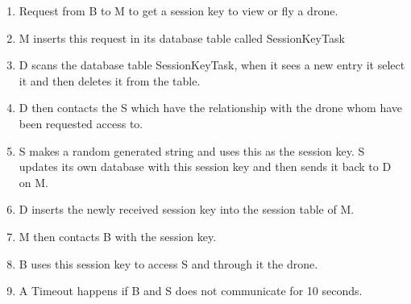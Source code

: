 \begin{enumerate}
	\item Request from B to M to get a session key to view or fly a drone.
	\item M inserts this request in its database table called SessionKeyTask
	\item D scans the database table SessionKeyTask, when it sees a new entry it select it and then deletes it from the table.
	\item D then contacts the S which have the relationship with the drone whom have been requested access to.
	\item S makes a random generated string and uses this as the session key. S updates its own database with this session key and then sends it back to D on M.
	\item D inserts the newly received session key into the session table of M.
	\item M then contacts B with the session key.
	\item B uses this session key to access S and through it the drone.
	\item A Timeout happens if B and S does not communicate for 10 seconds.
\end{enumerate}